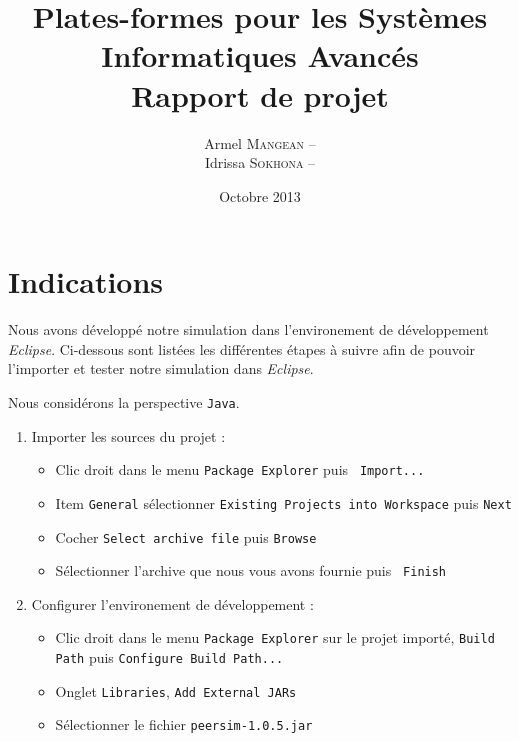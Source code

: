 \documentclass{article}
\title{
  {\bf Plates-formes pour les Systèmes Informatiques Avancés} \\
  Rapport de projet}
\author{
  Armel   \textsc{Mangean} -- \oldstylenums{3262313} \\
  Idrissa \textsc{Sokhona} -- \oldstylenums{3101058}}
\date{Octobre 2013}
\begin{document}
  \maketitle

  \section*{Indications}

    Nous avons développé notre simulation dans l'environement de développement
    {\it Eclipse}. Ci-dessous sont listées les différentes étapes à suivre afin
    de pouvoir l'importer et tester notre simulation dans {\it Eclipse}. \medskip

    \noindent
    Nous considérons la perspective {\tt Java}.
    \begin{enumerate}
      \item
        Importer les sources du projet :
        \begin{itemize}
          \item Clic droit dans le menu {\tt Package Explorer} puis {\tt
            Import...}
          \item Item {\tt General} sélectionner {\tt Existing Projects into
            Workspace} puis {\tt Next}
          \item Cocher {\tt Select archive file} puis {\tt Browse}
          \item Sélectionner l'archive que nous vous avons fournie puis {\tt
            Finish}
        \end{itemize}

      \item
        Configurer l'environement de développement :
        \begin{itemize}
          \item Clic droit dans le menu {\tt Package Explorer} sur le projet
            importé, {\tt Build Path} puis {\tt Configure Build Path...}
          \item Onglet {\tt Libraries}, {\tt Add External JARs}
          \item Sélectionner le fichier {\tt peersim-1.0.5.jar}
        \end{itemize}


\end{enumerate}
\end{document}
